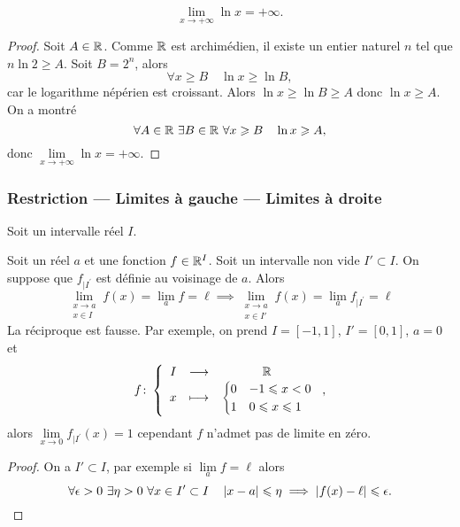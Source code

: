 \begin{theo}
  \begin{equation}
    \lim\limits_{x \to +\infty} \ln x = + \infty.
  \end{equation}
\end{theo}
\begin{proof}
  Soit \(A \in \mathbb{R}\). Comme \(\mathbb{R}\) est archimédien, il existe un entier naturel
  \(n\) tel que \(n \ln 2 \geqslant A\). Soit \(B=2^n\), alors
  \begin{equation}
    \forall x \geqslant B \quad \ln x \geqslant \ln B,
  \end{equation}
  car le logarithme népérien est croissant. Alors \(\ln x \geqslant \ln B
  \geqslant A\) donc \(\ln x \geqslant A\). On a montré
  \begin{equation}
    \forall A \in \mathbb{R} \ \exists B \in \mathbb{R} \ \forall x \geqslant B \quad \ln x
    \geqslant A,
  \end{equation}
  donc \(\lim\limits_{x \to +\infty} \ln x = + \infty\).
\end{proof}

\subsubsection{Restriction --- Limites à gauche --- Limites à droite}
Soit un intervalle réel \(I\).
\begin{prop}
  Soit un réel \(a\) et une fonction \(f \in \mathbb{R}^I\). Soit un intervalle non vide
  \(I' \subset I\). On suppose que \(f_{|I^{'}}\) est définie au voisinage de
  \(a\). Alors
  \begin{equation}
    \lim\limits_{\begin{array}{l} x \to a \\ x \in
      I\end{array}}f(x)=\lim\limits_{a}f=\ell \implies
      \lim\limits_{\begin{array}{l} x \to a \\ x \in
      I'\end{array}}f(x)=\lim\limits_{a}f_{|I^{'}}=\ell
  \end{equation}
  La réciproque est fausse. Par exemple, on prend \(I=[-1,1]\), \(I'=[0,1]\),
  \(a=0\) et
  \begin{equation}
    \fonction{f}{I}{\R}{x}{%
      \begin{cases}
          0 & -1 \leqslant x < 0 \\
          1 & 0 \leqslant x \leqslant 1
      \end{cases}
    },
  \end{equation}
  alors \(\lim\limits_{x \to 0}f_{|I^{'}}(x)=1\) cependant \(f\) n'admet pas de
  limite en zéro.
\end{prop}
\begin{proof}
  On a \( I' \subset I\), par exemple si \(\lim\limits_{a} f =\ell\) alors
  \begin{equation}
    \forall \epsilon > 0 \ \exists \eta > 0 \ \forall x \in I' \subset I \quad
    \left\lvert x-a\right\rvert \leqslant \eta \implies \left\lvert f(x) - \ell\right\rvert \leqslant \epsilon.
  \end{equation}
\end{proof}

